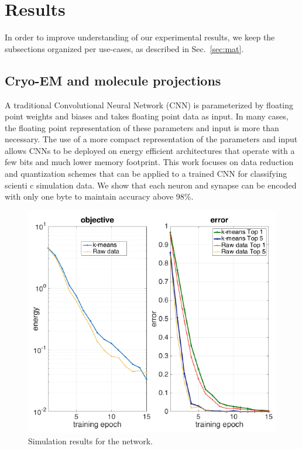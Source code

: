 \section{Results}
In order to improve understanding of our experimental results, we keep the subsections organized per use-cases, as described in Sec.~\ref{sec:mat}.

\subsection{Cryo-EM and molecule projections}
A traditional Convolutional Neural Network (CNN) is parameterized by floating point weights and biases and takes floating point data as input. In many cases, the floating point representation of these parameters and input is more than necessary. The use of a more compact representation of the parameters and input allows CNNs to be deployed on energy efficient architectures that operate with a few bits and much lower memory footprint. This work focuses on data reduction and quantization schemes that can be applied to a trained CNN for classifying scienti c simulation data. We show that each
neuron and synapse can be encoded with only one byte to maintain accuracy above 98\%.

\begin{figure}[h]
\centering
\includegraphics[width=\linewidth]{img/joao3.png}
\caption{Simulation results for the network.}
\label{fig_sim}
\end{figure}


